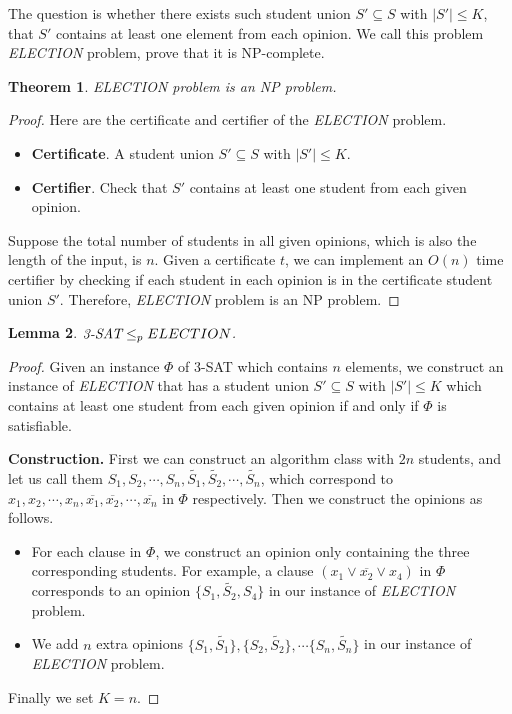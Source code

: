 \documentclass[12pt,a4paper]{article}
\newtheorem{theorem}{Theorem}
\newtheorem{lemma}[theorem]{Lemma}
\theoremstyle{definition}
\begin{document}
\begin{enumerate}
	The question is whether there exists such student union $S' \subseteq S$ with $|S'|\leq K$, that $S'$ contains at least one element from each opinion. We call this problem \emph{ELECTION} problem, prove that it is NP-complete.
    \begin{theorem}\label{ELECTION-NP}
    ELECTION problem is an NP problem.
    \end{theorem}
    \begin{proof}
    Here are the certificate and certifier of the \emph{ELECTION} problem.
    \begin{itemize}
    \item \textbf{Certificate}. A student union $S' \subseteq S$ with $|S'|\leq K$.
    \item \textbf{Certifier}. Check that $S'$ contains at least one student from each given opinion.
    \end{itemize}
    Suppose the total number of students in all given opinions, which is also the length of the input, is $n$. Given a certificate $t$, we can implement an $O(n)$ time certifier by checking if each student in each opinion is in the certificate student union $S'$. Therefore, \emph{ELECTION} problem is an NP problem.
    \end{proof}
    \begin{lemma}\label{3-SAT-REDUCE-ELECTION}
    $\emph{3-SAT} \leq_p ELECTION$.
    \end{lemma}
    \begin{proof}
    Given an instance $\Phi$ of 3-SAT which contains $n$ elements, we construct an instance of \emph{ELECTION} that has a student union $S' \subseteq S$ with $|S'|\leq K$ which contains at least one student from each given opinion if and only if $\Phi$ is satisfiable.
    
    \textbf{Construction.} First we can construct an algorithm class with $2n$ students, and let us call them $S_1, S_2, \cdots, S_n, \tilde{S_1}, \tilde{S_2}, \cdots, \tilde{S_n}$, which correspond to $x_1, x_2, \cdots, x_n, \overline{x_1}, \overline{x_2}, \cdots, \overline{x_n}$ in $\Phi$ respectively. Then we construct the opinions as follows.
    \begin{itemize}
    \item For each clause in $\Phi$, we construct an opinion only containing the three corresponding students. For example, a clause $(x_1 \lor \overline{x_2} \lor x_4)$ in $\Phi$ corresponds to an opinion $\{S_1, \tilde{S_2}, S_4\}$ in our instance of \emph{ELECTION} problem.
    \item We add $n$ extra opinions $\{S_1, \tilde{S_1}\}, \{S_2, \tilde{S_2}\}, \cdots \{S_n, \tilde{S_n}\}$ in our instance of \emph{ELECTION} problem.
    \end{itemize}
    Finally we set $K = n$.
    

\end{proof}
\end{enumerate}
\end{document}
